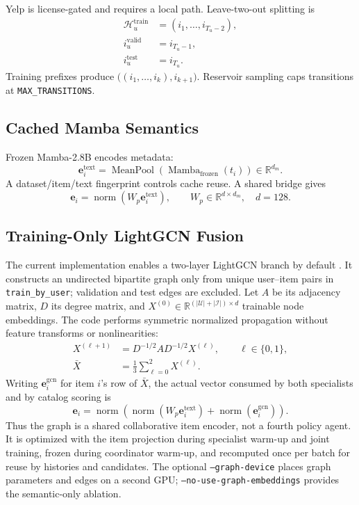 \documentclass[11pt,a4paper]{article}
\newcommand{\R}{\mathbb{R}}
\begin{document}
Yelp is license-gated and requires a local path. Leave-two-out splitting is
\begin{align}
  \mathcal H_u^{\mathrm{train}}&=(i_1,\ldots,i_{T_u-2}),\\
  i_u^{\mathrm{valid}}&=i_{T_u-1},\\
  i_u^{\mathrm{test}}&=i_{T_u}.
\end{align}
Training prefixes produce $\big((i_1,\ldots,i_k),i_{k+1}\big)$. Reservoir sampling caps transitions at \texttt{MAX\_TRANSITIONS}.

\subsection{Cached Mamba Semantics}

Frozen Mamba-2.8B encodes metadata:
\begin{equation}
  \bm e_i^{\mathrm{text}}
  =
  \operatorname{MeanPool}
  \left(\operatorname{Mamba}_{\mathrm{frozen}}(t_i)\right)
  \in\R^{d_m}.
\end{equation}
A dataset/item/text fingerprint controls cache reuse. A shared bridge gives
\begin{equation}
  \bm e_i=\operatorname{norm}(W_p\bm e_i^{\mathrm{text}}),
  \qquad W_p\in\R^{d\times d_m},\quad d=128.
\end{equation}

\subsection{Training-Only LightGCN Fusion}

The current implementation enables a two-layer LightGCN branch by default
\cite{LIGHTGCN}. It constructs an undirected bipartite graph only from unique
user--item pairs in \texttt{train\_by\_user}; validation and test edges are
excluded. Let $A$ be its adjacency matrix, $D$ its degree matrix, and
$X^{(0)}\in\R^{(|\mathcal U|+|\mathcal I|)\times d}$ trainable node embeddings.
The code performs symmetric normalized propagation without feature transforms
or nonlinearities:
\begin{align}
  X^{(\ell+1)} &= D^{-1/2}AD^{-1/2}X^{(\ell)},\qquad \ell\in\{0,1\},\\
  \bar X &= \frac{1}{3}\sum_{\ell=0}^{2}X^{(\ell)}.
\end{align}
Writing $\bm e_i^{\mathrm{gcn}}$ for item $i$'s row of $\bar X$, the actual
vector consumed by both specialists and by catalog scoring is
\begin{equation}
  \bm e_i=\operatorname{norm}\!\left(
    \operatorname{norm}(W_p\bm e_i^{\mathrm{text}})+
    \operatorname{norm}(\bm e_i^{\mathrm{gcn}})
  \right).
\end{equation}
Thus the graph is a shared collaborative item encoder, not a fourth policy
agent. It is optimized with the item projection during specialist warm-up and
joint training, frozen during coordinator warm-up, and recomputed once per
batch for reuse by histories and candidates. The optional
\texttt{--graph-device} places graph parameters and edges on a second GPU;
\texttt{--no-use-graph-embeddings} provides the semantic-only ablation.
\end{document}
